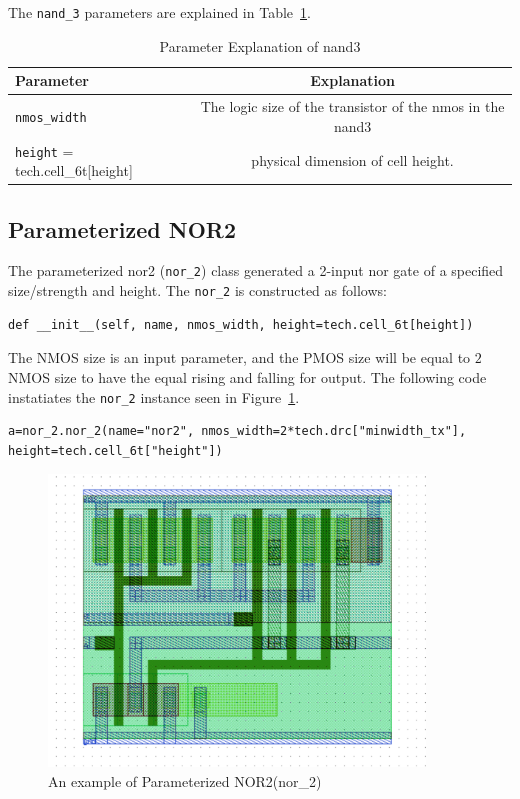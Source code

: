 The \verb|nand_3| parameters are explained in Table~\ref{table:nand3_params}.
\begin{table}[h!] 
  \begin{center}
    \begin{tabular}{| l | c |}
    \hline
    Parameter & Explanation \\ \hline
    \verb|nmos_width| & The logic size of the transistor of the nmos in the nand3 \\ \hline
    \verb|height| = tech.cell\_6t[height] & physical dimension of cell height. \\ 
    \hline
    \end{tabular}
  \end{center}
  \caption{Parameter Explanation of nand3}
  \label{table:nand3_params}
\end{table}


\subsection{Parameterized NOR2}
\label{sec:nor2}

The parameterized nor2 (\verb|nor_2|) class generated a 2-input nor gate
of a specified size/strength and height.  The \verb|nor_2| is
constructed as follows:
\begin{verbatim}
def __init__(self, name, nmos_width, height=tech.cell_6t[height])
\end{verbatim}
The NMOS size is an input parameter, and the PMOS size
will be equal to $2$ NMOS size to have the equal rising and falling for output.
The following code instatiates the \verb|nor_2| instance seen in Figure~\ref{fig:nor2}.
\begin{verbatim}
a=nor_2.nor_2(name="nor2", nmos_width=2*tech.drc["minwidth_tx"], 
height=tech.cell_6t["height"])
\end{verbatim}


\begin{figure}[h!]
\centering
\includegraphics[width=10cm]{./figs/nor2.pdf}
\caption{An example of Parameterized NOR2(nor\_2)}
\label{fig:nor2}
\end{figure}

